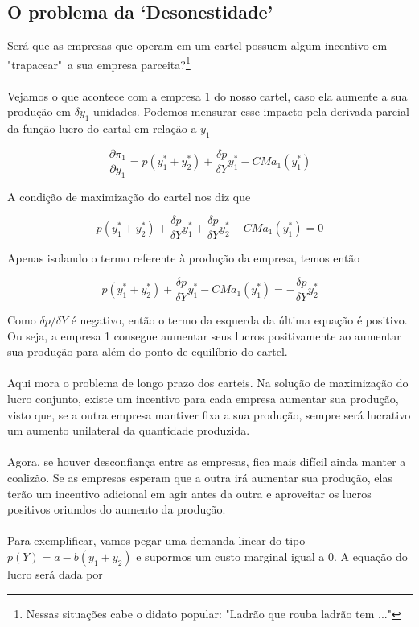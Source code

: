 \documentclass[a4paper,11pt,oneside]{book}
\theoremstyle{definition}
\theoremstyle{break}
\begin{document}
\subsection{O problema da `Desonestidade'}

Será que as empresas que operam em um cartel possuem algum incentivo em "trapacear"\ a sua empresa parceita?\footnote{Nessas situações cabe o didato popular: "Ladrão que rouba ladrão tem ..."}
\\
\\
Vejamos o que acontece com a empresa 1 do nosso cartel, caso ela aumente a sua produção em $\delta y_1$ unidades. Podemos mensurar esse impacto pela derivada parcial da função lucro do cartal em relação a $y_1$

$$ \frac{\partial \pi_1}{\partial y_1} = p(y_1^* + y_2^*) + \frac{\delta p}{\delta Y}y_1^* - CMa_1(y_1^*) $$ 

A condição de maximização do cartel nos diz que

$$ p(y_1^* + y_2^*) + \frac{\delta p}{\delta Y}y_1^* + \frac{\delta p}{\delta Y}y_2^* - CMa_1(y_1^*) = 0 $$ 

Apenas isolando o termo referente à produção da empresa, temos então

$$ p(y_1^* + y_2^*) + \frac{\delta p}{\delta Y}y_1^* - CMa_1(y_1^*) = - \frac{\delta p}{\delta Y}y_2^* $$ 

Como $\delta p / \delta Y$ é negativo, então o termo da esquerda da última equação é positivo. Ou seja, a empresa 1 consegue aumentar seus lucros positivamente ao aumentar sua produção para além do ponto de equilíbrio do cartel.
\\
\\
Aqui mora o problema de longo prazo dos carteis. Na solução de maximização do lucro conjunto, existe um incentivo para cada empresa aumentar sua produção, visto que, se a outra empresa mantiver fixa a sua produção, sempre será lucrativo um aumento unilateral da quantidade produzida.
\\
\\
Agora, se houver desconfiança entre as empresas, fica mais difícil ainda manter a coalizão. Se as empresas esperam que a outra irá aumentar sua produção, elas terão um incentivo adicional em agir antes da outra e aproveitar os lucros positivos oriundos do aumento da produção.
\\
\\
Para exemplificar, vamos pegar uma demanda linear do tipo $p(Y) = a - b(y_1 + y_2)$ e supormos um custo marginal igual a $0$. A equação do lucro será dada por 
\end{document}
